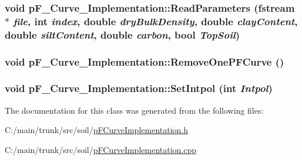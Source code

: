 \label{classp_f___curve___implementation_ada7b4e4d08e6af2dc5df656853506104}
\hypertarget{classp_f___curve___implementation_a86f7e116cbf225b8094ffc0738684bc4}{
\subsubsection[{ReadParameters}]{\setlength{\rightskip}{0pt plus 5cm}void pF\_\-Curve\_\-Implementation::ReadParameters (fstream $\ast$ {\em file}, \/  int {\em index}, \/  double {\em dryBulkDensity}, \/  double {\em clayContent}, \/  double {\em siltContent}, \/  double {\em carbon}, \/  bool {\em TopSoil})}}
\label{classp_f___curve___implementation_a86f7e116cbf225b8094ffc0738684bc4}
\hypertarget{classp_f___curve___implementation_a90613f53c0a26185ecceccaff4c56668}{
\subsubsection[{RemoveOnePFCurve}]{\setlength{\rightskip}{0pt plus 5cm}void pF\_\-Curve\_\-Implementation::RemoveOnePFCurve ()}}
\label{classp_f___curve___implementation_a90613f53c0a26185ecceccaff4c56668}
\hypertarget{classp_f___curve___implementation_a7c68c1d6ef72351fb8b24115aa89c057}{
\subsubsection[{SetIntpol}]{\setlength{\rightskip}{0pt plus 5cm}void pF\_\-Curve\_\-Implementation::SetIntpol (int {\em Intpol})}}
\label{classp_f___curve___implementation_a7c68c1d6ef72351fb8b24115aa89c057}


The documentation for this class was generated from the following files:\begin{DoxyCompactItemize}
\item 
C:/main/trunk/src/soil/\hyperlink{p_f_curve_implementation_8h}{pFCurveImplementation.h}\item 
C:/main/trunk/src/soil/\hyperlink{p_f_curve_implementation_8cpp}{pFCurveImplementation.cpp}\end{DoxyCompactItemize}
